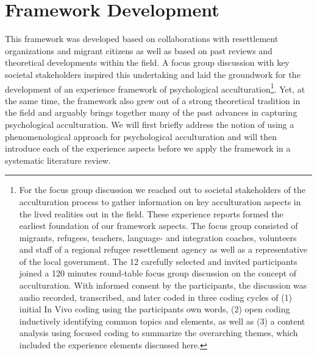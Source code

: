 \documentclass[man, 12pt, a4paper]{apa7}
\begin{document}
\section{Framework Development} 
This framework was developed based on collaborations with resettlement organizations and migrant citizens as well as based on past reviews and theoretical developments within the field. A focus group discussion with key societal stakeholders inspired this undertaking and laid the groundwork for the development of an experience framework of psychological acculturation\footnote{For the focus group discussion we reached out to societal stakeholders of the acculturation process to gather information on key acculturation aspects in the lived realities out in the field. These experience reports formed the earliest foundation of our framework aspects. The focus group consisted of migrants, refugees, teachers, language- and integration coaches, volunteers and staff of a regional refugee resettlement agency as well as a representative of the local government. The 12 carefully selected and invited participants joined a 120 minutes round-table focus group discussion on the concept of acculturation. With informed consent by the participants, the discussion was audio recorded, transcribed, and later coded in three coding cycles of (1) initial In Vivo coding using the participants own words, (2) open coding inductively identifying common topics and elements, as well as (3) a content analysis using focused coding to summarize the overarching themes, which included the experience elements discussed here.}. Yet, at the same time, the framework also grew out of a strong theoretical tradition in the field and arguably brings together many of the past advances in capturing psychological acculturation. We will first briefly address the notion of using a phenomenological approach for psychological acculturation and will then introduce each of the experience aspects before we apply the framework in a systematic literature review.
\end{document}

